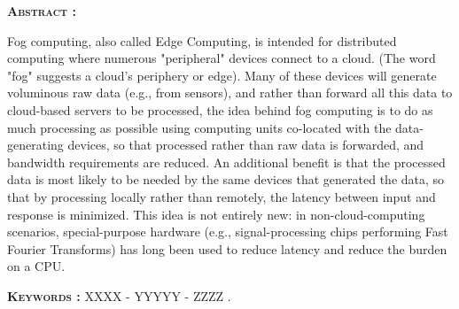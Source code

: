 \textsc{\textbf{Abstract :}}

Fog computing, also called Edge Computing, is intended for distributed computing where numerous "peripheral" devices connect to a cloud. (The word "fog" suggests a cloud's periphery or edge). Many of these devices will generate voluminous raw data (e.g., from sensors), and rather than forward all this data to cloud-based servers to be processed, the idea behind fog computing is to do as much processing as possible using computing units co-located with the data-generating devices, so that processed rather than raw data is forwarded, and bandwidth requirements are reduced. An additional benefit is that the processed data is most likely to be needed by the same devices that generated the data, so that by processing locally rather than remotely, the latency between input and response is minimized. This idea is not entirely new: in non-cloud-computing scenarios, special-purpose hardware (e.g., signal-processing chips performing Fast Fourier Transforms) has long been used to reduce latency and reduce the burden on a CPU.

\textsc{\textbf{Keywords :}} XXXX - YYYYY - ZZZZ .\\ \\